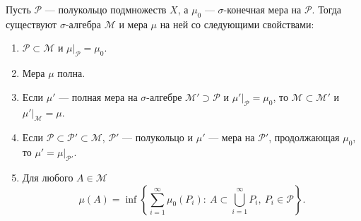 \label{definition:17}

\begin{theorem}
Пусть $\mathcal P$ --- полукольцо подмножеств $X$, а $\mu_0$ --- $\sigma$-конечная мера на $\mathcal P$.
Тогда существуют $\sigma$-алгебра $\mathcal M$ и мера $\mu$ на ней со следующими свойствами:
\begin{enumerate}
  \item $\mathcal P\subset\mathcal M$ и $\mu|_{\mathcal P}=\mu_0$.
  \item Мера $\mu$ полна.
  \item Если $\mu'$ --- полная мера на $\sigma$-алгебре $\mathcal M'\supset\mathcal P$ и $\mu'|_{\mathcal P}=\mu_0$, то $\mathcal M\subset\mathcal M'$ и $\mu'|_{\mathcal M}=\mu$.
  \item Если $\mathcal P\subset\mathcal P'\subset\mathcal M$, $\mathcal P'$ --- полукольцо и $\mu'$ --- мера на $\mathcal P'$, продолжающая $\mu_0$, то $\mu' = \mu|_{\mathcal P'}$.
  \item Для любого $A\in\mathcal M$
  \[
    \mu(A)=\inf\left\{\sum_{i=1}^{\infty}\mu_0(P_i):
    \ A\subset\bigcup_{i=1}^{\infty}P_i,\ P_i\in\mathcal P\right\}.
  \]
\end{enumerate}
\end{theorem}
